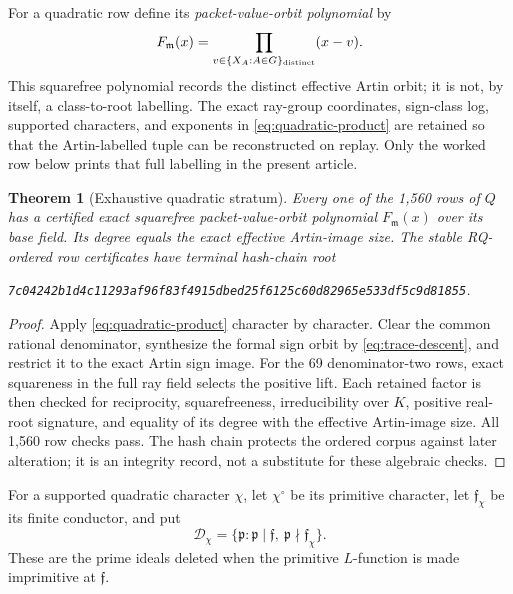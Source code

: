 \documentclass[11pt]{article}
\newtheorem{theorem}{Theorem}
\begin{document}
For a quadratic row define its \emph{packet-value-orbit polynomial} by
\[
 F_{\mathfrak m}(x)=\prod_{v\in\{X_A:A\in G\}_{\rm distinct}}(x-v).
\]
This squarefree polynomial records the distinct effective Artin orbit;
it is not, by itself, a class-to-root labelling.  The exact ray-group
coordinates, sign-class log, supported characters, and exponents in
\eqref{eq:quadratic-product} are retained so that the Artin-labelled
tuple can be reconstructed on replay.  Only the worked row below prints
that full labelling in the present article.

\begin{theorem}[Exhaustive quadratic stratum]\label{thm:quadratic}
Every one of the 1,560 rows of $Q$ has a certified exact squarefree
packet-value-orbit polynomial $F_{\mathfrak m}(x)$ over its base field.
Its degree equals the exact effective Artin-image size.  The stable
RQ-ordered row certificates have terminal hash-chain root
\begin{center}\small\texttt{7c04242b1d4c11293af96f83f4915dbed25f6125c60d82965e533df5c9d81855}.\end{center}
\end{theorem}

\begin{proof}
Apply \eqref{eq:quadratic-product} character by character.  Clear the
common rational denominator, synthesize the formal sign orbit by
\eqref{eq:trace-descent}, and restrict it to the exact Artin sign image.
For the 69 denominator-two rows, exact squareness in the full ray field
selects the positive lift.  Each retained factor is then checked for
reciprocity, squarefreeness, irreducibility over $K$, positive real-root
signature, and equality of its degree with the effective Artin-image
size.  All 1,560 row checks pass.  The hash chain protects the ordered
corpus against later alteration; it is an integrity record, not a
substitute for these algebraic checks.
\end{proof}

For a supported quadratic character $\chi$, let $\chi^\circ$ be its
primitive character, let $\mathfrak f_\chi$ be its finite conductor,
and put
\[
 \mathcal D_\chi=\{\mathfrak p:\mathfrak p\mid\mathfrak f,
                    \ \mathfrak p\nmid\mathfrak f_\chi\}.
\]
These are the prime ideals deleted when the primitive $L$-function is
made imprimitive at $\mathfrak f$.
\end{document}
